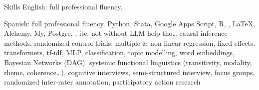 
\begin{rubric}{Skills}
\entry*[Languages]
	English: full professional fluency. \par Spanish: full professional fluency.
	Python, Stata, Google Apps Script, R, , \LaTeX, 
\entry*[Databases]
	Alchemy, My, Postgre, , ite. \tiny{not without LLM help tho\ldots}
	causal inference methods, randomized control trials, multiple \& non-linear regression, fixed effects.
	transformers, tf-idf, MLP, classification, topic modelling, word embeddings, Bayesian Networks (DAG).
	systemic functional linguistics (transitivity, modality, rheme, coherence\ldots), cognitive interviews, semi-structured interview, focus groups, randomized inter-rater annotation, participatory action research
\end{rubric}
